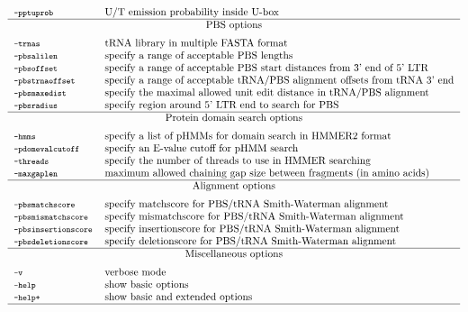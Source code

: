 \documentclass[12pt,titlepage]{article}
\begin{document}
\begin{table}[htbp]
\begin{footnotesize}
\[\begin{tabular}{ll}
\\
\Showoption{pptuprob}& U/T emission probability inside U-box
\\
\Showoptiongroup{PBS options}
\Showoption{trnas}& tRNA library in multiple FASTA format
\\
\Showoption{pbsalilen}& specify a range of acceptable PBS lengths
\\
\Showoption{pbsoffset}& specify a range of acceptable PBS start distances from 3' end of 5' LTR
\\
\Showoption{pbstrnaoffset}& specify a range of acceptable tRNA/PBS alignment offsets from tRNA 3' end
\\
\Showoption{pbsmaxedist}& specify the maximal allowed unit edit distance in tRNA/PBS alignment
\\
\Showoption{pbsradius}& specify region around 5' LTR end to search for PBS
\\
\Showoptiongroup{Protein domain search options}
\Showoption{hmms}& specify a list of pHMMs for domain search in HMMER2 format
\\
\Showoption{pdomevalcutoff}& specify an E-value cutoff for pHMM search
\\
\Showoption{threads}& specify the number of threads to use in HMMER searching
\\
\Showoption{maxgaplen}& maximum allowed chaining gap size between fragments (in amino acids)

\\
\Showoptiongroup{Alignment options}
\Showoption{pbsmatchscore}& specify matchscore for PBS/tRNA Smith-Waterman alignment
\\
\Showoption{pbsmismatchscore}& specify mismatchscore for PBS/tRNA Smith-Waterman alignment
\\
\Showoption{pbsinsertionscore}& specify insertionscore for PBS/tRNA Smith-Waterman alignment
\\
\Showoption{pbsdeletionscore}& specify deletionscore for PBS/tRNA Smith-Waterman alignment
\\
\Showoptiongroup{Miscellaneous options}
\Showoption{v}& verbose mode
\\
\Showoption{help}& show basic options
\\
\Showoption{help+}& show basic and extended options
\\
\hline
\end{tabular}
\]
\end{footnotesize}
\label{overviewOpt}
\end{table}
\end{document}
